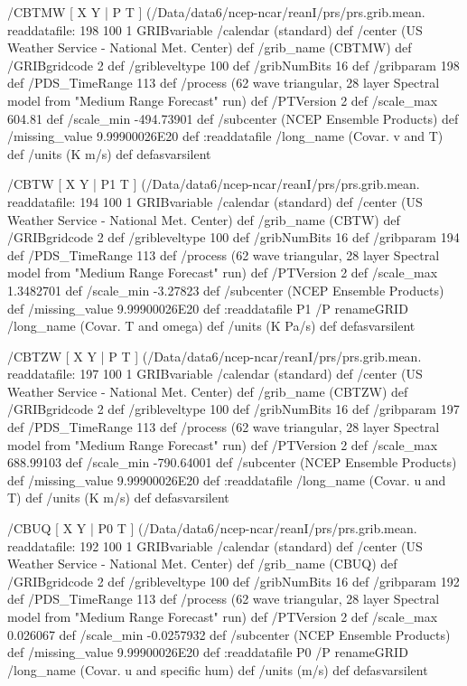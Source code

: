 \begin{ingrid}
  /CBTMW { [ X Y | P T ] (/Data/data6/ncep-ncar/reanI/prs/prs.grib.mean.%
  readdatafile:
  198 100 1 GRIBvariable
  /calendar (standard) def
  /center (US Weather Service - National Met. Center) def
  /grib_name (CBTMW) def
  /GRIBgridcode 2 def
  /gribleveltype 100 def
  /gribNumBits 16 def
  /gribparam 198 def
  /PDS_TimeRange 113 def
  /process (62 wave triangular, 28 layer Spectral model from "Medium Range Forecast" run) def
  /PTVersion 2 def
  /scale_max 604.81 def
  /scale_min -494.73901 def
  /subcenter (NCEP Ensemble Products) def
  /missing_value 9.99900026E20 def
  :readdatafile
  /long_name (Covar. v and T) def
  /units (K m/s) def
  } defasvarsilent

  /CBTW { [ X Y | P1 T ] (/Data/data6/ncep-ncar/reanI/prs/prs.grib.mean.%
  readdatafile:
  194 100 1 GRIBvariable
  /calendar (standard) def
  /center (US Weather Service - National Met. Center) def
  /grib_name (CBTW) def
  /GRIBgridcode 2 def
  /gribleveltype 100 def
  /gribNumBits 16 def
  /gribparam 194 def
  /PDS_TimeRange 113 def
  /process (62 wave triangular, 28 layer Spectral model from "Medium Range Forecast" run) def
  /PTVersion 2 def
  /scale_max 1.3482701 def
  /scale_min -3.27823 def
  /subcenter (NCEP Ensemble Products) def
  /missing_value 9.99900026E20 def
  :readdatafile
  P1 /P renameGRID
  /long_name (Covar. T and omega) def
  /units (K Pa/s) def
  } defasvarsilent

  /CBTZW { [ X Y | P T ] (/Data/data6/ncep-ncar/reanI/prs/prs.grib.mean.%
  readdatafile:
  197 100 1 GRIBvariable
  /calendar (standard) def
  /center (US Weather Service - National Met. Center) def
  /grib_name (CBTZW) def
  /GRIBgridcode 2 def
  /gribleveltype 100 def
  /gribNumBits 16 def
  /gribparam 197 def
  /PDS_TimeRange 113 def
  /process (62 wave triangular, 28 layer Spectral model from "Medium Range Forecast" run) def
  /PTVersion 2 def
  /scale_max 688.99103 def
  /scale_min -790.64001 def
  /subcenter (NCEP Ensemble Products) def
  /missing_value 9.99900026E20 def
  :readdatafile
  /long_name (Covar. u and T) def
  /units (K m/s) def
  } defasvarsilent

  /CBUQ { [ X Y | P0 T ] (/Data/data6/ncep-ncar/reanI/prs/prs.grib.mean.%
  readdatafile:
  192 100 1 GRIBvariable
  /calendar (standard) def
  /center (US Weather Service - National Met. Center) def
  /grib_name (CBUQ) def
  /GRIBgridcode 2 def
  /gribleveltype 100 def
  /gribNumBits 16 def
  /gribparam 192 def
  /PDS_TimeRange 113 def
  /process (62 wave triangular, 28 layer Spectral model from "Medium Range Forecast" run) def
  /PTVersion 2 def
  /scale_max 0.026067 def
  /scale_min -0.0257932 def
  /subcenter (NCEP Ensemble Products) def
  /missing_value 9.99900026E20 def
  :readdatafile
  P0 /P renameGRID
  /long_name (Covar. u and specific hum) def
  /units (m/s) def
  } defasvarsilent


\end{ingrid}
